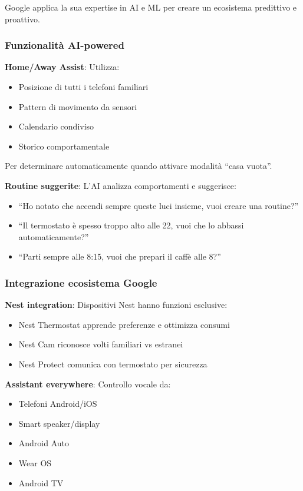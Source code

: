 Google applica la sua expertise in AI e ML per creare un ecosistema predittivo e proattivo.

\subsubsection{Funzionalità AI-powered}

\textbf{Home/Away Assist}: Utilizza:
\begin{itemize}
    \item Posizione di tutti i telefoni familiari
    \item Pattern di movimento da sensori
    \item Calendario condiviso
    \item Storico comportamentale
\end{itemize}

Per determinare automaticamente quando attivare modalità ``casa vuota''.

\textbf{Routine suggerite}: L'AI analizza comportamenti e suggerisce:
\begin{itemize}
    \item ``Ho notato che accendi sempre queste luci insieme, vuoi creare una routine?''
    \item ``Il termostato è spesso troppo alto alle 22, vuoi che lo abbassi automaticamente?''
    \item ``Parti sempre alle 8:15, vuoi che prepari il caffè alle 8?''
\end{itemize}

\subsubsection{Integrazione ecosistema Google}

\textbf{Nest integration}: Dispositivi Nest hanno funzioni esclusive:
\begin{itemize}
    \item Nest Thermostat apprende preferenze e ottimizza consumi
    \item Nest Cam riconosce volti familiari vs estranei
    \item Nest Protect comunica con termostato per sicurezza
\end{itemize}

\textbf{Assistant everywhere}: Controllo vocale da:
\begin{itemize}
    \item Telefoni Android/iOS
    \item Smart speaker/display
    \item Android Auto
    \item Wear OS
    \item Android TV
\end{itemize}

